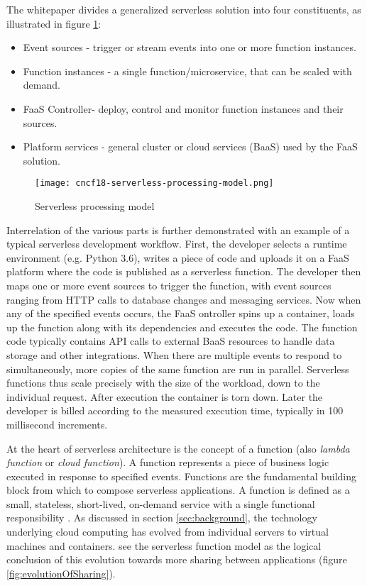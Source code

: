 The \textcite{cncf18serverlessWG} whitepaper divides a generalized serverless solution into four constituents, as illustrated in figure \ref{fig:processingModel}:

\begin{itemize}
  \item Event sources - trigger or stream events into one or more function instances.
  \item Function instances - a single function/microservice, that can be scaled with demand.
  \item FaaS Controller- deploy, control and monitor function instances and their sources.
  \item Platform services - general cluster or cloud services (BaaS) used by the FaaS solution.
\end{itemize}

\begin{figure}[h]
  \centering
  \texttt{[image: cncf18-serverless-processing-model.png]}
  \caption{Serverless processing model \parencite{cncf18serverlessWG}}
  \label{fig:processingModel}
\end{figure}

Interrelation of the various parts is further demonstrated with an example of a typical serverless development workflow. First, the developer selects a runtime environment (e.g. Python 3.6), writes a piece of code and uploads it on a FaaS platform where the code is published as a serverless function. The developer then maps one or more event sources to trigger the function, with event sources ranging from HTTP calls to database changes and messaging services. Now when any of the specified events occurs, the FaaS ontroller spins up a container, loads up the function along with its dependencies and executes the code. The function code typically contains API calls to external BaaS resources to handle data storage and other integrations. When there are multiple events to respond to simultaneously, more copies of the same function are run in parallel. Serverless functions thus scale precisely with the size of the workload, down to the individual request. After execution the container is torn down. Later the developer is billed according to the measured execution time, typically in 100 millisecond increments. \parencite{awslambda0218}

At the heart of serverless architecture is the concept of a function (also \textit{lambda function} or \textit{cloud function}). A function represents a piece of business logic executed in response to specified events. Functions are the fundamental building block from which to compose serverless applications. A function is defined as a small, stateless, short-lived, on-demand service with a single functional responsibility \parencite{van2017spec}. As discussed in section \ref{sec:background}, the technology underlying cloud computing has evolved from individual servers to virtual machines and containers. \textcite{hendrickson16openlambda} see the serverless function model as the logical conclusion of this evolution towards more sharing between applications (figure \ref{fig:evolutionOfSharing}).

